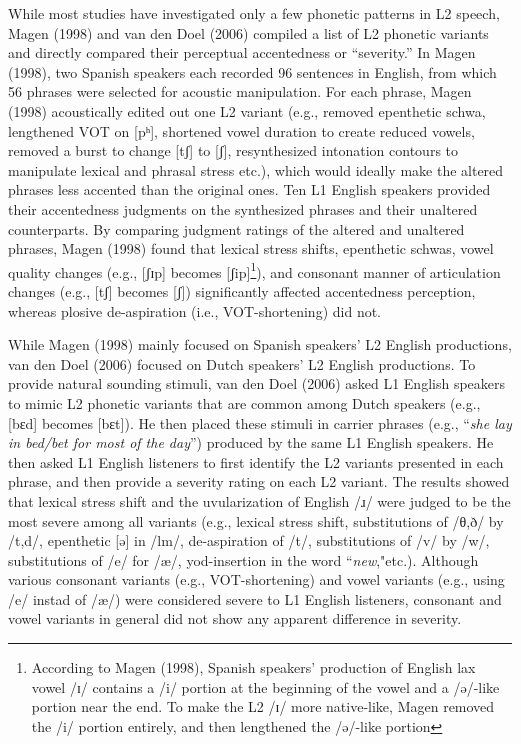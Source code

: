 While most studies have investigated only a few phonetic patterns in L2 speech, Magen (1998) and van den Doel (2006) compiled a list of L2 phonetic variants and directly compared their perceptual accentedness or “severity.” In Magen (1998), two Spanish speakers each recorded 96 sentences in English, from which 56 phrases were selected for acoustic manipulation. For each phrase, Magen (1998) acoustically edited out one L2 variant (e.g., removed epenthetic schwa, lengthened VOT on [pʰ], shortened vowel duration to create reduced vowels, removed a burst to change [tʃ] to [ʃ], resynthesized intonation contours to manipulate lexical and phrasal stress etc.), which would ideally make the altered phrases less accented than the original ones. Ten L1 English speakers provided their accentedness judgments on the synthesized phrases and their unaltered counterparts. By comparing judgment ratings of the altered and unaltered phrases, Magen (1998) found that lexical stress shifts, epenthetic schwas, vowel quality changes (e.g., [ʃɪp] becomes [ʃip]\footnote[1]{According to Magen (1998), Spanish speakers’ production of English lax vowel /ɪ/ contains a /i/ portion at the beginning of the vowel and a /ə/-like portion near the end. To make the L2 /ɪ/ more native-like, Magen removed the /i/ portion entirely, and then lengthened the /ə/-like portion}), and consonant manner of articulation changes (e.g., [tʃ] becomes [ʃ]) significantly affected accentedness perception, whereas plosive de-aspiration (i.e., VOT-shortening) did not. 

While Magen (1998) mainly focused on Spanish speakers’ L2 English productions, van den Doel (2006) focused on Dutch speakers’ L2 English productions. To provide natural sounding stimuli, van den Doel (2006) asked L1 English speakers to mimic L2 phonetic variants that are common among Dutch speakers (e.g., [bɛd] becomes [bɛt]). He then placed these stimuli in carrier phrases (e.g., “\textit{she lay in bed/bet for most of the day}”) produced by the same L1 English speakers. He then asked L1 English listeners to first identify the L2 variants presented in each phrase, and then provide a severity rating on each L2 variant. The results showed that lexical stress shift and the uvularization of English /ɹ/ were judged to be the most severe among all variants (e.g., lexical stress shift, substitutions of /θ,ð/ by /t,d/, epenthetic [ə] in /lm/, de-aspiration of /t/, substitutions of /v/ by /w/, substitutions of /e/ for /æ/, yod-insertion in the word ``\textit{new},"etc.). Although various consonant variants (e.g., VOT-shortening) and vowel variants (e.g., using /e/ instad of /æ/) were considered severe to L1 English listeners, consonant and vowel variants in general did not show any apparent difference in severity.

